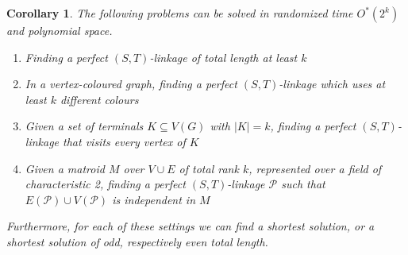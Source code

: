 \documentclass[10pt,a4paper]{article}
\newtheorem{corollary}{Corollary}[section]
\newcommand{\cP}{\ensuremath{\mathcal P}\xspace}
\begin{document}
\begin{corollary}
  \label{cor:framework-linkage}
  The following problems can be solved in randomized time $O^*(2^k)$
  and polynomial space. 
  \begin{enumerate}
  \item Finding a perfect $(S,T)$-linkage of total length at least $k$
  \item In a vertex-coloured graph, finding a perfect $(S,T)$-linkage
    which uses at least $k$ different colours
  \item Given a set of terminals $K \subseteq V(G)$ with $|K|=k$, 
    finding a perfect $(S,T)$-linkage that visits every vertex of $K$
  \item Given a matroid $M$ over $V \cup E$ of total rank $k$,
    represented over a field of characteristic 2, 
    finding a perfect $(S,T)$-linkage $\cP$ such that $E(\cP) \cup
    V(\cP)$ is independent in $M$
  \end{enumerate}
  Furthermore, for each of these settings we can find a
  \emph{shortest} solution, or a shortest solution of odd,
  respectively even total length. 
\end{corollary}
\end{document}

